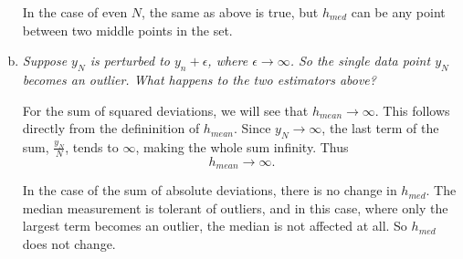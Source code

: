 \documentclass{article}
\begin{document}
\begin{enumerate}[(a)]
    In the case of even $N$, the same as above is true, but $h_{med}$ can be any point between
    two middle points in the set.
    

  \item \textit{Suppose $y_N$ is perturbed to $y_n + \epsilon$, where $\epsilon \rightarrow \infty$. So the single data point $y_N$ becomes an outlier. What happens to the two estimators above?}

    For the sum of squared deviations, we will see that $h_{mean} \rightarrow \infty$. This
    follows directly from the defininition of $h_{mean}$. Since $y_N \rightarrow \infty$,
    the last term of the sum, $\frac{y_N}{N}$, tends to $\infty$, making the whole sum infinity.
    Thus $$h_{mean} \rightarrow \infty.$$

    In the case of the sum of absolute deviations, there is no change in $h_{med}$. The median
    measurement is tolerant of outliers, and in this case, where only the largest term becomes
    an outlier, the median is not affected at all. So $h_{med}$ does not change.

\end{enumerate}
\end{document}
